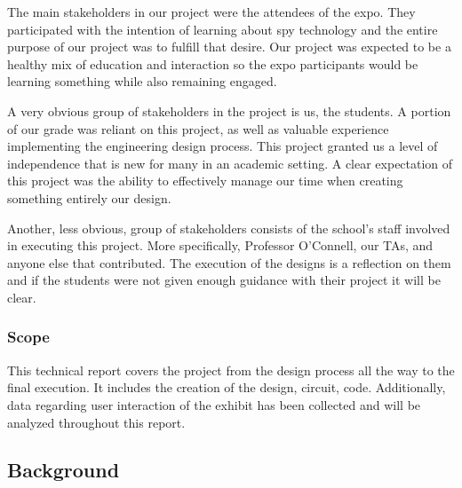 \documentclass[conference]{IEEEtran}
\begin{document}
    \par The main stakeholders in our project were the attendees of the expo. They participated with the intention of learning about spy technology and the entire purpose of our project was to fulfill that desire. Our project was expected to be a healthy mix of education and interaction so the expo participants would be learning something while also remaining engaged. 
\par A very obvious group of stakeholders in the project is us, the students. A portion of our grade was reliant on this project, as well as valuable experience implementing the engineering design process. This project granted us a level of independence that is new for many in an academic setting. A clear expectation of this project was the ability to effectively manage our time when creating something entirely our design. 
    \par Another, less obvious, group of stakeholders consists of the school’s staff involved in executing this project. More specifically, Professor O’Connell, our TAs, and anyone else that contributed. The execution of the designs is a reflection on them and if the students were not given enough guidance with their project it will be clear.

    \subsubsection{Scope}

\par This technical report covers the project from the design process all the way to the final execution. It includes the creation of the design, circuit, code. Additionally, data regarding user interaction of the exhibit has been collected and will be analyzed throughout this report. 

\subsection{Background}
\end{document}
